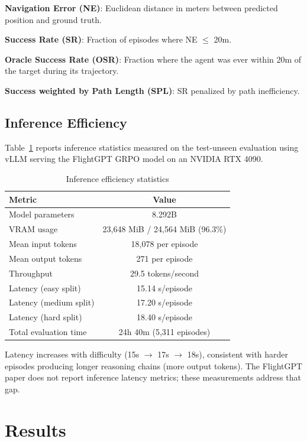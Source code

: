 \documentclass[conference]{IEEEtran}
\begin{document}
\textbf{Navigation Error (NE)}: Euclidean distance in meters between predicted position and ground truth.

\textbf{Success Rate (SR)}: Fraction of episodes where NE $\leq$ 20m.

\textbf{Oracle Success Rate (OSR)}: Fraction where the agent was ever within 20m of the target during its trajectory.

\textbf{Success weighted by Path Length (SPL)}: SR penalized by path inefficiency.

\subsection{Inference Efficiency}

Table~\ref{tab:inference} reports inference statistics measured on the test-unseen evaluation using vLLM serving the FlightGPT GRPO model on an NVIDIA RTX 4090.

\begin{table}[h]
\centering
\caption{Inference efficiency statistics}
\label{tab:inference}
\begin{tabular}{lc}
\toprule
Metric & Value \\
\midrule
Model parameters & 8.292B \\
VRAM usage & 23,648 MiB / 24,564 MiB (96.3\%) \\
Mean input tokens & 18,078 per episode \\
Mean output tokens & 271 per episode \\
Throughput & 29.5 tokens/second \\
Latency (easy split) & 15.14 s/episode \\
Latency (medium split) & 17.20 s/episode \\
Latency (hard split) & 18.40 s/episode \\
Total evaluation time & 24h 40m (5,311 episodes) \\
\bottomrule
\end{tabular}
\end{table}

Latency increases with difficulty (15s $\rightarrow$ 17s $\rightarrow$ 18s), consistent with harder episodes producing longer reasoning chains (more output tokens). The FlightGPT paper \cite{flightgpt} does not report inference latency metrics; these measurements address that gap.

\section{Results}
\end{document}

